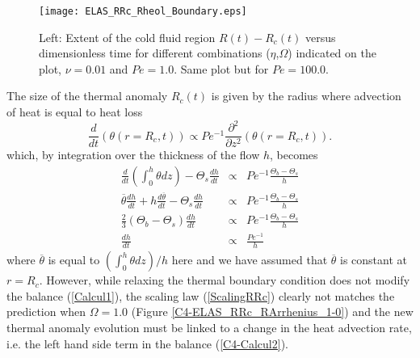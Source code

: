 \begin{figure}[htpb]
  \begin{center}
    \graphicspath{ {/Users/thorey/Documents/These/Projet/Refroidissement/Skin_Model/Figure/Figure_Heating/} }
    \texttt{[image: ELAS\_RRc\_Rheol\_Boundary.eps]}
    \caption{Left:  Extent  of  the cold  fluid  region  $R(t)-R_c(t)$
      versus   dimensionless    time   for    different   combinations
      ($\eta$,$\Omega$)   indicated  on   the  plot,   $\nu=0.01$  and
      $Pe=1.0$. Same plot but for $Pe=100.0$.}
    \label{C4-ELAS_RRc_Rheol_Boundary}
  \end{center}
\end{figure}

The size of the thermal anomaly  $R_c(t)$ is given by the radius where
advection of heat is equal to heat loss
\begin{equation}
  \frac{d}{d    t}\left(\theta(r=   R_c,t)\right)    \propto   Pe^{-1}
  \frac{\partial^2}{\partial z^2}\left(\theta(r=R_c,t)\right).
  \label{C4-HeatequationThermal}
\end{equation}
which, by integration over the thickness of the flow $h$, becomes
\begin{eqnarray}
  \frac{d}{dt}\left(\int_0^h\theta           dz\right)-\Theta_s\frac{d
  h}{dt}&\propto& Pe^{-1} \frac{\Theta_b-\Theta_s}{h}\nonumber\\
  \overline{\theta}\frac{d h}{dt}+h\frac{d \overline{\theta}}{dt}-\Theta_s\frac{d
  h}{dt}&\propto& Pe^{-1}
                  \frac{\Theta_b-\Theta_s}{h}\nonumber\\
  \frac{2}{3}\left(\Theta_b-\Theta_s\right)\frac{d  h}{d   t}&\propto& Pe^{-1}
                                                                       \frac{\Theta_b-\Theta_s}{h}\nonumber\\
  \frac{d h}{d t}&\propto& \frac{Pe^{-1}}{h}\label{C4-Calcul2}
\end{eqnarray}
where $\overline{\theta}$  is equal  to $(\int_0^h \theta  dz)/h$ here
and  we   have  assumed   that  $\overline{\theta}$  is   constant  at
$r=R_c$. However,  while relaxing the thermal  boundary condition does
not   modify   the   balance    (\ref{Calcul1}),   the   scaling   law
(\ref{ScalingRRc})   clearly   not   matches   the   prediction   when
$\Omega=1.0$  (Figure  \ref{C4-ELAS_RRc_RArrhenius_1-0}) and  the  new
thermal  anomaly evolution  must be  linked to  a change  in the  heat
advection  rate,  i.e.   the  left  hand  side  term  in  the  balance
(\ref{C4-Calcul2}).

